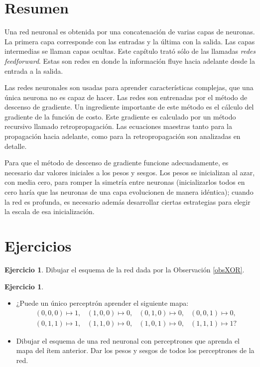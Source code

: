 \documentclass[12pt, a4paper]{amsbook}
\theoremstyle{remark}
\theoremstyle{definition}
\newtheorem{ejer}[teo]{Ejercicio}
\numberwithin{section}{chapter}
\numberwithin{subsection}{section}
\numberwithin{equation}{section}
\numberwithin{figure}{chapter}
\begin{document}
\section{Resumen}\label{sec.c6.4}

Una red neuronal es obtenida por una concatenación de varias capas de neuronas. La primera capa corresponde con las entradas y la última con la salida. Las capas intermedias se llaman capas ocultas. Este capítulo trató sólo de las llamadas {\em redes feedforward}. Estas son redes en donde la información fluye hacia adelante desde la entrada a la salida.

Las redes neuronales son usadas para aprender características complejas, que una única neurona no es capaz de hacer. Las redes son entrenadas por el método de descenso de gradiente. Un ingrediente importante de este método es el cálculo del gradiente de la función de costo. Este gradiente es calculado por un método recursivo llamado retropropagación. Las ecuaciones maestras tanto para la propagación hacia adelante, como para la retropropagación son analizadas en detalle.

Para que el método de descenso de gradiente funcione adecuadamente, es necesario dar valores iniciales a los pesos y sesgos. Los pesos se inicializan al azar, con media cero, para romper la simetría entre neuronas (inicializarlos todos en cero haría que las neuronas de una capa evolucionen de manera idéntica); cuando la red es profunda, es necesario además desarrollar ciertas estrategias para elegir la escala de esa inicialización.

\section{Ejercicios}\label{sec.c6.5}

\begin{ejer}
Dibujar el esquema de la red dada por la Observación \ref{obsXOR}.
\end{ejer}

\begin{ejer}
\begin{itemize}
\item[(a)] ¿Puede un único perceptrón aprender el siguiente mapa:
$$\begin{array}{llll}
(0,0,0)\mapsto 1, & (1,0,0)\mapsto 0, & (0,1,0)\mapsto 0, & (0,0,1)\mapsto 0,\\
(0,1,1)\mapsto 1, & (1,1,0)\mapsto 0, & (1,0,1)\mapsto 0, & (1,1,1)\mapsto 1?
\end{array}
$$

\item[(b)] Dibujar el esquema de una red neuronal con perceptrones que aprenda el mapa del ítem anterior. Dar los pesos y sesgos de todos los perceptrones de la red.
\end{itemize}
\end{ejer}
\end{document}
